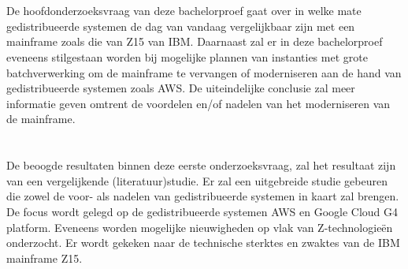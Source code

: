 \section{}
\label{sec:onderzoeksvraag}

De hoofdonderzoeksvraag van deze bachelorproef gaat over in welke mate gedistribueerde systemen de dag van vandaag vergelijkbaar zijn met een mainframe zoals die van Z15 van IBM. Daarnaast zal er in deze bachelorproef eveneens stilgestaan worden bij mogelijke plannen van instanties met grote batchverwerking om de mainframe te vervangen of moderniseren aan de hand van gedistribueerde systemen zoals AWS. De uiteindelijke conclusie zal meer informatie geven omtrent de voordelen en/of nadelen van het moderniseren van de mainframe. 

\section{}
\label{sec:onderzoeksdoelstelling}

\subsection{}

De beoogde resultaten binnen deze eerste onderzoeksvraag, zal het resultaat zijn van een vergelijkende (literatuur)studie. Er zal een uitgebreide studie gebeuren die zowel de voor- als nadelen van gedistribueerde systemen in kaart zal brengen. De focus wordt gelegd op de gedistribueerde systemen AWS en Google Cloud G4 platform. Eveneens worden mogelijke nieuwigheden op vlak van Z-technologieën onderzocht. Er wordt gekeken naar de technische sterktes en zwaktes van de IBM mainframe Z15.

\subsection{}

